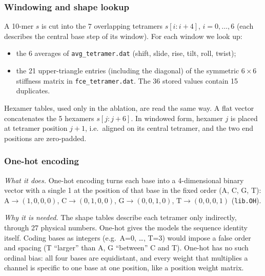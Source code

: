 \subsubsection{Windowing and shape lookup}
A 10-mer $s$ is cut into the $7$ overlapping tetramers $s[i{:}i{+}4]$, $i=0,\dots,6$ (each describes the central base step of its window). For each window we look up:
\begin{itemize}
\item the 6 averages of \texttt{avg\_tetramer.dat} (shift, slide, rise, tilt, roll, twist);
\item the 21 upper-triangle entries (including the diagonal) of the symmetric $6\times6$ stiffness matrix in \texttt{fce\_tetramer.dat}. The 36 stored values contain 15 duplicates.
\end{itemize}
Hexamer tables, used only in the ablation, are read the same way. A flat vector concatenates the 5 hexamers $s[j{:}j{+}6]$. In windowed form, hexamer $j$ is placed at tetramer position $j{+}1$, i.e.\ aligned on its central tetramer, and the two end positions are zero-padded.

\subsubsection{One-hot encoding}
\emph{What it does.} One-hot encoding turns each base into a 4-dimensional binary vector with a single 1 at the position of that base in the fixed order (A, C, G, T): $\mathrm{A}\to(1,0,0,0)$, $\mathrm{C}\to(0,1,0,0)$, $\mathrm{G}\to(0,0,1,0)$, $\mathrm{T}\to(0,0,0,1)$ (\texttt{lib.OH}).

\emph{Why it is needed.} The shape tables describe each tetramer only indirectly, through 27 physical numbers. One-hot gives the models the sequence identity itself. Coding bases as integers (e.g.\ A=0, \dots, T=3) would impose a false order and spacing (T ``larger'' than A, G ``between'' C and T). One-hot has no such ordinal bias: all four bases are equidistant, and every weight that multiplies a channel is specific to one base at one position, like a position weight matrix.

